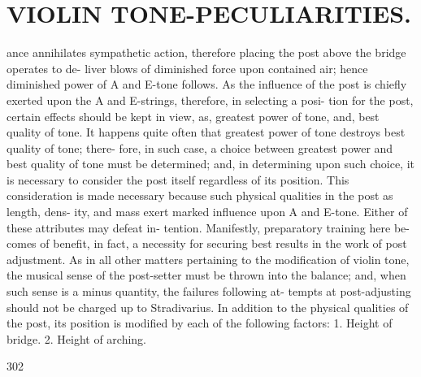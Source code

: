 \documentclass{article}
\begin{document}
\section*{VIOLIN TONE-PECULIARITIES.}
ance annihilates sympathetic action, therefore placing the post above the bridge operates to de- liver blows of diminished force upon contained air; hence diminished power of A and E-tone follows. As the influence of the post is chiefly exerted upon the A and E-strings, therefore, in selecting a posi- tion for the post, certain effects should be kept in view, as, greatest power of tone, and, best quality of tone. It happens quite often that greatest power of tone destroys best quality of tone; there- fore, in such case, a choice between greatest power and best quality of tone must be determined; and, in determining upon such choice, it is necessary to consider the post itself regardless of its position. This consideration is made necessary because such physical qualities in the post as length, dens- ity, and mass exert marked influence upon A and E-tone. Either of these attributes may defeat in- tention. Manifestly, preparatory training here be- comes of benefit, in fact, a necessity for securing best results in the work of post adjustment. As in all other matters pertaining to the modification of violin tone, the musical sense of the post-setter must be thrown into the balance; and, when such sense is a minus quantity, the failures following at- tempts at post-adjusting should not be charged up to Stradivarius. In addition to the physical qualities of the post, its position is modified by each of the following factors: 1. Height of bridge. 2. Height of arching.

302
\end{document}
